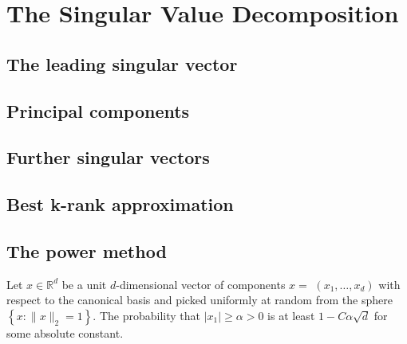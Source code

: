 \documentclass[a4paper, english, headtopline=0.08em, headsepline=0.04em, left = 1cm, right = 1cm, DIV=15]{article}
\begin{document}
\section{The Singular Value Decomposition}
\subsection{The leading singular vector}
\subsection{Principal components}
\subsection{Further singular vectors}
\subsection{Best k-rank approximation}

\subsection{The power method}
\begin{lemma} \label{lemma6.1} %
Let $x \in \mathbb{R}^{d}$ be a unit $d$-dimensional vector of components $x=$ $\left(x_{1}, \ldots, x_{d}\right)$ with respect to the canonical basis and picked uniformly at random from the sphere $\left\{x:\|x\|_{2}=1\right\}$. The probability that $\left|x_{1}\right| \geq \alpha>0$ is at least $1-C \alpha \sqrt{d}$ for some absolute constant.
\end{lemma}
\end{document}
